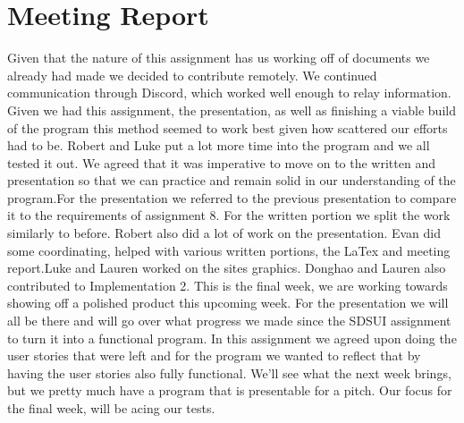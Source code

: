 \documentclass[12pt, letterpaper]{article}
\begin{document}
\section{Meeting Report}
Given that the nature of this assignment has us working off of documents we already had made we decided to contribute remotely. We continued communication through Discord, which worked well enough to relay information. Given we had this assignment, the presentation, as well as finishing a viable build of the program this method seemed to work best given how scattered our efforts had to be. Robert and Luke put a lot more time into the program and we all tested it out. We agreed that it was imperative to move on to the written and presentation so that we can practice and remain solid in our understanding of the program.For the presentation we referred to the previous presentation to compare it to the requirements of assignment 8. For the written portion we split the work similarly to before. Robert also did a lot of work on the presentation. Evan did some coordinating, helped with various written portions, the LaTex and meeting report.Luke and Lauren worked on the sites graphics. Donghao and Lauren also contributed to Implementation 2. 
This is the final week, we are working towards showing off a polished product this upcoming week. For the presentation we will all be there and will go over what progress we made since the SDSUI assignment to turn it into a functional program. In this assignment we agreed upon doing the user stories that were left and for the program we wanted to reflect that by having the user stories also fully functional. We’ll see what the next week brings, but we pretty much have a program that is presentable for a pitch. Our focus for the final week, will be acing our tests. 
\end{document}
